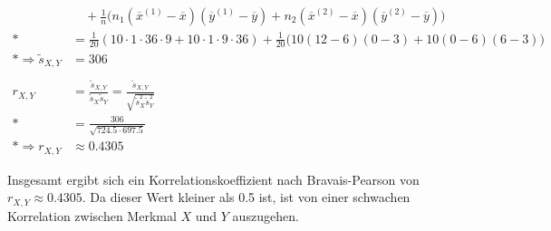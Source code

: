 {\begin{align*}
        &\quad + \frac1n \big( n_1 (\overline{x}^{(1)} - \overline{x}) (\overline{y}^{(1)} - \overline{y})
            + n_2 (\overline{x}^{(2)} - \overline{x}) (\overline{y}^{(2)} - \overline{y}) \big) \\*
        &= \frac{1}{20} (10\cdot1\cdot36\cdot9 + 10\cdot1\cdot9\cdot36) +
            \frac{1}{20} \big( 10(12-6)(0-3) + 10(0-6)(6-3) \big) \\*
        \Rightarrow \tilde{s}_{X,Y}&= 306\\
        \nonumber \\
        r_{X,Y} &= \frac{\tilde{s}_{X,Y}}{\tilde{s}_X \tilde{s}_Y} = \frac{\tilde{s}_{X,Y}}{\sqrt{\tilde{s}_X^2 \tilde{s}_Y^2}} \\*
        &= \frac{306}{\sqrt{724.5 \cdot 697.5}} \\*
        \Rightarrow r_{X,Y} &\approx 0.4305
    \end{align*}
}

Insgesamt ergibt sich ein Korrelationskoeffizient nach Bravais-Pearson von $r_{X,Y}\approx0.4305$. Da dieser Wert kleiner als 0.5 ist, ist von einer schwachen Korrelation zwischen Merkmal $X$ und $Y$ auszugehen.
